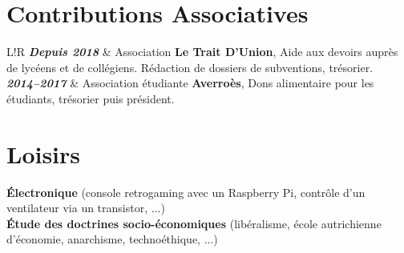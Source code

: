\documentclass[10pt]{article}
\newcommand\VRule{\color{lightgray}\vrule width 2pt}
\begin{document}
\vspace{1ex}

\section*{Contributions Associatives}

\vspace{2ex}

\begin{tabular}{L!{\VRule}R}
\textbf{\textit{Depuis 2018}} & Association \textbf{Le Trait D’Union}, Aide aux devoirs auprès de lycéens et de collégiens. Rédaction de dossiers de subventions, trésorier. \\[0.75cm]

\textbf{\textit{2014--2017}} & Association étudiante \textbf{Averroès}, Dons alimentaire pour les étudiants, trésorier puis président. \\
\end{tabular}

\vspace{2ex}

\section*{Loisirs}

\vspace{2ex}

\hspace*{1ex} \textbf{Électronique} (console retrogaming avec un Raspberry Pi, contrôle d'un ventilateur via un transistor, ...) \\
\hspace*{1ex} \textbf{Étude des doctrines socio-économiques} (libéralisme, école autrichienne d'économie, anarchisme, technoéthique, ...) \\
\end{document}
